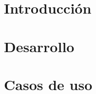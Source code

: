 \documentclass[a4paper, 10pt, twoside]{article}
\begin{document}
\newpage




\tableofcontents

\newpage




\section{Introducción}




\section{Desarrollo}




\section{Casos de uso}
\end{document}
